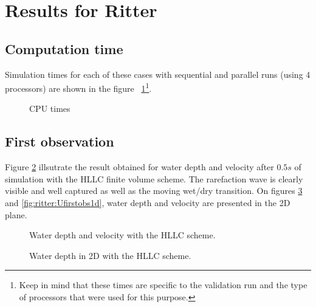 \section{Results for Ritter}


\subsection{Computation time}

Simulation times for each of these cases with sequential and parallel runs (using 4 processors) are shown in the figure ~\ref{fig:ritter:cputime}\footnote{Keep in mind that these times
are specific to the validation run and the type of processors that were used for this purpose.}.

\begin{figure}[H]
  \centering
  \caption{CPU times}\label{fig:ritter:cputime}
\end{figure}

\subsection{First observation}

Figure \ref{fig:ritter:firstobs1d} illsutrate the result obtained for water depth and velocity after $0.5s$ of
simulation with the HLLC finite volume scheme. The rarefaction wave is clearly visible and well 
captured as well as the moving wet/dry transition.
On figures \ref{fig:ritter:Hfirstobs1d} and  \ref{fig:ritter:Ufirstobs1d}, water depth and velocity are presented in the 2D plane.

\begin{figure}[H]
\begin{minipage}[t]{0.5\textwidth}
 \centering
\end{minipage}%
\begin{minipage}[t]{0.5\textwidth}
 \centering
\end{minipage}
  \caption{Water depth and velocity with the HLLC scheme.}
  \label{fig:ritter:firstobs1d}
\end{figure}

\begin{figure}[H]
 \centering
  \caption{Water depth in 2D with the HLLC scheme.}
  \label{fig:ritter:Hfirstobs1d}
\end{figure}

